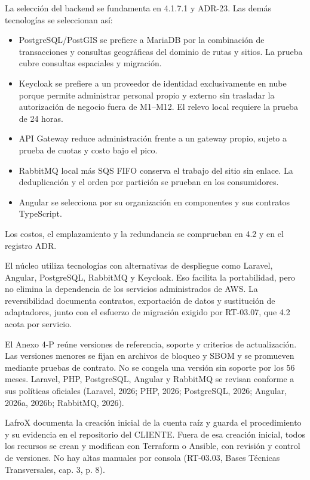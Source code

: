La selección del backend se fundamenta en 4.1.7.1 y ADR-23. Las demás tecnologías se seleccionan así:

\begin{itemize}
\item PostgreSQL/PostGIS se prefiere a MariaDB por la combinación de transacciones y consultas geográficas del dominio de rutas y sitios. La prueba cubre consultas espaciales y migración.

\item Keycloak se prefiere a un proveedor de identidad exclusivamente en nube porque permite administrar personal propio y externo sin trasladar la autorización de negocio fuera de M1–M12. El relevo local requiere la prueba de 24 horas.

\item API Gateway reduce administración frente a un gateway propio, sujeto a prueba de cuotas y costo bajo el pico.

\item RabbitMQ local más SQS FIFO conserva el trabajo del sitio sin enlace. La deduplicación y el orden por partición se prueban en los consumidores.

\item Angular se selecciona por su organización en componentes y sus contratos TypeScript.

\end{itemize}
Los costos, el emplazamiento y la redundancia se comprueban en 4.2 y en el registro ADR.

El núcleo utiliza tecnologías con alternativas de despliegue como Laravel, Angular, PostgreSQL, RabbitMQ y Keycloak. Eso facilita la portabilidad, pero no elimina la dependencia de los servicios administrados de AWS. La reversibilidad documenta contratos, exportación de datos y sustitución de adaptadores, junto con el esfuerzo de migración exigido por RT-03.07, que 4.2 acota por servicio.

El Anexo 4-P reúne versiones de referencia, soporte y criterios de actualización. Las versiones menores se fijan en archivos de bloqueo y SBOM y se promueven mediante pruebas de contrato. No se congela una versión sin soporte por los 56 meses. Laravel, PHP, PostgreSQL, Angular y RabbitMQ se revisan conforme a sus políticas oficiales (Laravel, 2026; PHP, 2026; PostgreSQL, 2026; Angular, 2026a, 2026b; RabbitMQ, 2026).

LafroX documenta la creación inicial de la cuenta raíz y guarda el procedimiento y su evidencia en el repositorio del CLIENTE. Fuera de esa creación inicial, todos los recursos se crean y modifican con Terraform o Ansible, con revisión y control de versiones. No hay altas manuales por consola (RT-03.03, Bases Técnicas Transversales, cap. 3, p. 8).

